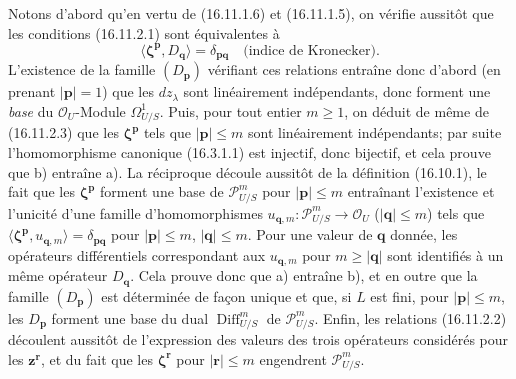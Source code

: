 Notons d'abord qu'en vertu de (16.11.1.6) et (16.11.1.5), on vérifie aussitôt
que les conditions (16.11.2.1) sont équivalentes à
\[
  \langle\boldsymbol{\zeta}^{\mathbf{p}},D_{\mathbf{q}}\rangle
  =\delta_{\mathbf{p}\mathbf{q}}
  \quad\text{(indice de Kronecker)}.
  \tag{16.11.2.3}
  \label{IV.16.11.2.3}
\]
L'existence de la famille $(D_{\mathbf{p}})$ vérifiant ces relations entraîne
donc d'abord (en prenant $|\mathbf{p}|=1$) que les $dz_\lambda$ sont
linéairement indépendants, donc forment une \emph{base} du
$\mathcal{O}_U$-Module $\Omega_{U/S}^1$. Puis, pour tout entier $m\geq1$, on
déduit de même de (16.11.2.3) que les $\boldsymbol{\zeta}^{\mathbf{p}}$ tels
que $|\mathbf{p}|\leq m$ sont linéairement indépendants; par suite
l'homomorphisme canonique (16.3.1.1) est injectif, donc bijectif, et cela
prouve que b) entraîne a). La réciproque découle aussitôt de la définition
(16.10.1), le fait que les $\boldsymbol{\zeta}^{\mathbf{p}}$ forment une base
de $\mathscr{P}_{U/S}^m$ pour $|\mathbf{p}|\leq m$ entraînant l'existence et
l'unicité d'une famille d'homomorphismes
$u_{\mathbf{q},m}:\mathscr{P}_{U/S}^m\to\mathcal{O}_U$
($|\mathbf{q}|\leq m$) tels que
$\langle\boldsymbol{\zeta}^{\mathbf{p}},u_{\mathbf{q},m}\rangle
=\delta_{\mathbf{p}\mathbf{q}}$ pour $|\mathbf{p}|\leq m$,
$|\mathbf{q}|\leq m$. Pour une valeur de $\mathbf{q}$ donnée, les opérateurs
différentiels correspondant aux $u_{\mathbf{q},m}$ pour
$m\geq|\mathbf{q}|$ sont identifiés à un même opérateur $D_{\mathbf{q}}$.
Cela prouve donc que a) entraîne b), et en outre que la famille
$(D_{\mathbf{p}})$ est déterminée de façon unique et que, si $L$ est fini,
pour $|\mathbf{p}|\leq m$, les $D_{\mathbf{p}}$ forment une base du dual
$\operatorname{Diff}_{U/S}^m$ de $\mathscr{P}_{U/S}^m$. Enfin, les relations
(16.11.2.2) découlent aussitôt de l'expression des valeurs des trois
opérateurs considérés pour les $\mathbf{z}^{\mathbf{r}}$, et du fait que les
$\boldsymbol{\zeta}^{\mathbf{r}}$ pour $|\mathbf{r}|\leq m$ engendrent
$\mathscr{P}_{U/S}^m$.


